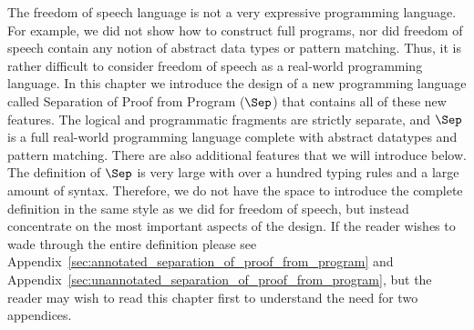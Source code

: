The freedom of speech language is not a very expressive programming
language.  For example, we did not show how to construct full
programs, nor did freedom of speech contain any notion of abstract
data types or pattern matching.  Thus, it is rather difficult to
consider freedom of speech as a real-world programming language.  In
this chapter we introduce the design of a new programming language
called Separation of Proof from Program ($\Sep$) that contains all of
these new features.  The logical and programmatic fragments are
strictly separate, and $\Sep$ is a full real-world programming
language complete with abstract datatypes and pattern matching.  There
are also additional features that we will introduce below.  The
definition of $\Sep$ is very large with over a hundred typing rules
and a large amount of syntax.  Therefore, we do not have the space to
introduce the complete definition in the same style as we did for
freedom of speech, but instead concentrate on the most important
aspects of the design.  If the reader wishes to wade through the
entire definition please see
Appendix~\ref{sec:annotated_separation_of_proof_from_program} and
Appendix~\ref{sec:unannotated_separation_of_proof_from_program}, but
the reader may wish to read this chapter first to understand the need
for two appendices.

